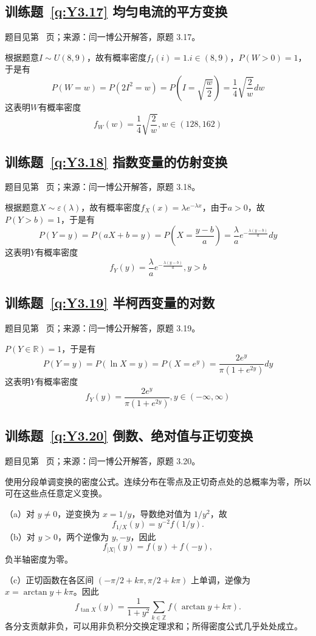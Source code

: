 \subsection*{训练题~\ref{q:Y3.17} 均匀电流的平方变换}\label{a:Y3.17}{\small 题目见第~\pageref{q:Y3.17} 页；来源：闫一博公开解答，原题 3.17。}
\begin{solve}
根据题意$I\sim U(8,9)$，故有概率密度$f_I(i)=1.i\in (8,9)$，$P(W>0)=1$，于是有
\[P(W = w) = P(2{I^2} = w) = P(I = \sqrt {\frac{w}{2}} ) = \frac{1}{4}\sqrt {\frac{2}{w}} dw\]
这表明$W$有概率密度
\[{f_W}(w) = \frac{1}{4}\sqrt {\frac{2}{w}},w\in(128,162) \]
\end{solve}

\subsection*{训练题~\ref{q:Y3.18} 指数变量的仿射变换}\label{a:Y3.18}{\small 题目见第~\pageref{q:Y3.18} 页；来源：闫一博公开解答，原题 3.18。}
\begin{solve}
根据题意$X\sim \varepsilon(\lambda)$，故有概率密度$f_X(x)=\lambda e^{-\lambda x}$，由于$a>0$，故$P(Y>b)=1$，于是有
\[P(Y = y) = P(aX + b = y) = P(X = \frac{{y - b}}{a}) = \frac{\lambda }{a}{e^{ - \frac{{\lambda (y - b)}}{a}}}dy\]
这表明$Y$有概率密度
\[{f_Y}(y) = \frac{\lambda }{a}{e^{ - \frac{{\lambda (y - b)}}{a}}},y > b\]
\end{solve}

\subsection*{训练题~\ref{q:Y3.19} 半柯西变量的对数}\label{a:Y3.19}{\small 题目见第~\pageref{q:Y3.19} 页；来源：闫一博公开解答，原题 3.19。}
\begin{solve}
$P(Y\in \mathbb{R})=1$，于是有 
\[P(Y = y) = P(\ln X = y) = P(X = {e^y}) = \frac{{2{e^y}}}{{\pi (1 + {e^{2y}})}}dy\]
这表明$Y$有概率密度
\[{f_Y}(y) = \frac{{2{e^y}}}{{\pi (1 + {e^{2y}})}},y \in ( - \infty ,\infty )\]
\end{solve}

\subsection*{训练题~\ref{q:Y3.20} 倒数、绝对值与正切变换}\label{a:Y3.20}{\small 题目见第~\pageref{q:Y3.20} 页；来源：闫一博公开解答，原题 3.20。}
\begin{solve}使用分段单调变换的密度公式。连续分布在零点及正切奇点处的总概率为零，所以可在这些点任意定义变换。\par（a）对 $y\ne0$，逆变换为 $x=1/y$，导数绝对值为 $1/y^2$，故\[f_{1/X}(y)=y^{-2}f(1/y).\]（b）对 $y>0$，两个逆像为 $y,-y$，因此\[f_{|X|}(y)=f(y)+f(-y),\]负半轴密度为零。\par（c）正切函数在各区间 $(-\pi/2+k\pi,\pi/2+k\pi)$ 上单调，逆像为 $x=\arctan y+k\pi$。因此\[f_{\tan X}(y)=\frac1{1+y^2}\sum_{k\in\mathbb Z}f(\arctan y+k\pi).\]各分支贡献非负，可以用非负积分交换定理求和；所得密度公式几乎处处成立。\end{solve}

